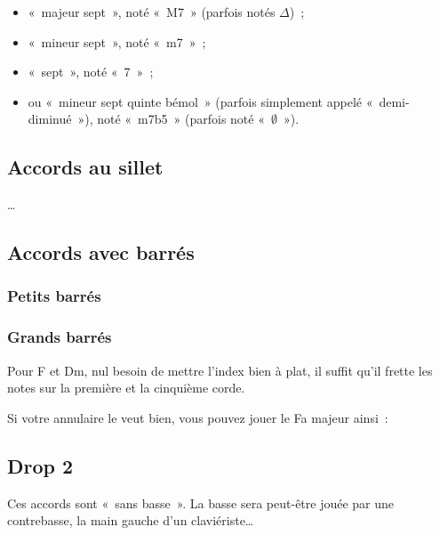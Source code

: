 \documentclass[11pt]{article}
\begin{document}
\begin{itemize}
\item «~majeur sept~», noté «~M7~» (parfois notés $\Delta$)~;
\item «~mineur sept~», noté «~m7~»~;
\item «~sept~», noté «~7~»~;
\item ou «~mineur sept quinte bémol~» (parfois simplement appelé
    «~demi-diminué~»), noté «~m7b5~» (parfois noté «~$\emptyset$~»).
\end{itemize}

\subsection{Accords au sillet}

\ldots


\subsection{Accords avec barrés}

\subsubsection{Petits barrés}


\subsubsection{Grands barrés}



Pour F et Dm, nul besoin de mettre l’index bien à plat, il suffit qu’il
frette les notes sur la première et la cinquième corde.

Si votre annulaire le veut bien, vous pouvez jouer le Fa majeur ainsi~:


\subsection{Drop 2}

Ces accords sont «~sans basse~». La basse sera peut-être jouée par une
contrebasse, la main gauche d’un claviériste…
\end{document}
